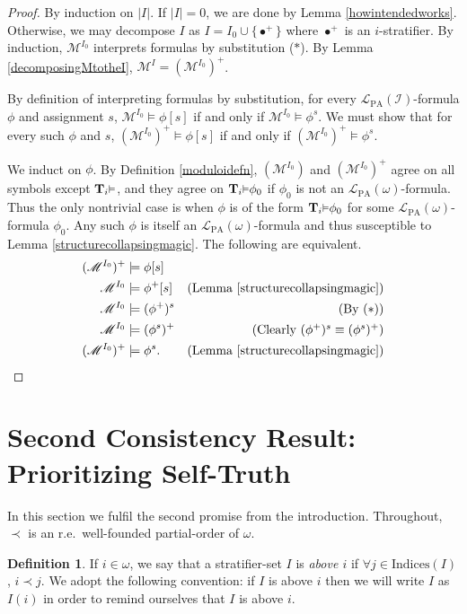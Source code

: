 \documentclass[reqno]{article}
\theoremstyle{definition}
\newtheorem{definition}[theorem]{Definition}
\def\L{\mathscr{L}}
\def\M{\mathscr{M}}
\def\T{\mathbf{T}}
\def\indices{\mathrm{Indices}}
\def\LPA{\L_{\mathrm{PA}}}
\def\indset{\mathcal I}
\renewcommand{\Pr}[1]{\T_{#1}\mbox{\small${\vDash}$}}
\begin{document}
\begin{proof}
By induction on $|I|$.
If $|I|=0$, we are done by Lemma \ref{howintendedworks}.
Otherwise, we may decompose $I$ as $I=I_0\cup\{\bullet^+\}$
where $\bullet^+$ is an $i$-stratifier.
By induction, $\M^{I_0}$ interprets formulas by substitution ($*$).
By Lemma \ref{decomposingMtotheI}, $\M^I=(\M^{I_0})^+$.

By definition of interpreting formulas by substitution,
for every $\LPA(\indset)$-formula $\phi$ and assignment $s$,
$\M^{I_0}\models\phi[s]$ if and only if $\M^{I_0}\models\phi^s$.
We must show that for every such $\phi$ and $s$, $(\M^{I_0})^+\models\phi[s]$ if and only
if $(\M^{I_0})^+\models\phi^s$.

We induct on $\phi$.
By Definition \ref{moduloidefn}, $(\M^{I_0})$ and $(\M^{I_0})^+$ agree on all symbols
except $\Pr i$, and they agree on $\Pr i \phi_0$ if $\phi_0$ is not an
$\LPA(\omega)$-formula.
Thus the only nontrivial case is when $\phi$
is of the form $\Pr i\phi_0$ for some $\LPA(\omega)$-formula $\phi_0$.
Any such $\phi$ is itself an $\LPA(\omega)$-formula and thus susceptible to
Lemma \ref{structurecollapsingmagic}.  The following are equivalent.
\begin{align*}
(\M^{I_0})^+ &\models \phi[s]\\
\M^{I_0} &\models \phi^+[s]
  &\mbox{(Lemma \ref{structurecollapsingmagic})}\\
\M^{I_0} &\models (\phi^+)^s
  &\mbox{(By ($*$))}\\
\M^{I_0} &\models (\phi^s)^+
  &\mbox{(Clearly $(\phi^+)^s\equiv(\phi^s)^+$)}\\
(\M^{I_0})^+ &\models \phi^s.
  &\mbox{(Lemma \ref{structurecollapsingmagic})}
\end{align*}
\end{proof}

\section[Second Consistency Result: Prioritizing Self-Truth]{Second Consistency Result:\\Prioritizing Self-Truth}

In this section
we fulfil the second promise from the introduction.
Throughout, $\prec$ is an r.e.~well-founded partial-order of $\omega$.

\begin{definition}
If $i\in\omega$, we say that a stratifier-set $I$ is \emph{above $i$}
if $\forall j\in\indices(I)$, $i\prec j$. We adopt the following convention:
if $I$ is above $i$ then we will write $I$ as $I(i)$ in order to remind
ourselves that $I$ is above $i$.
\end{definition}
\end{document}
